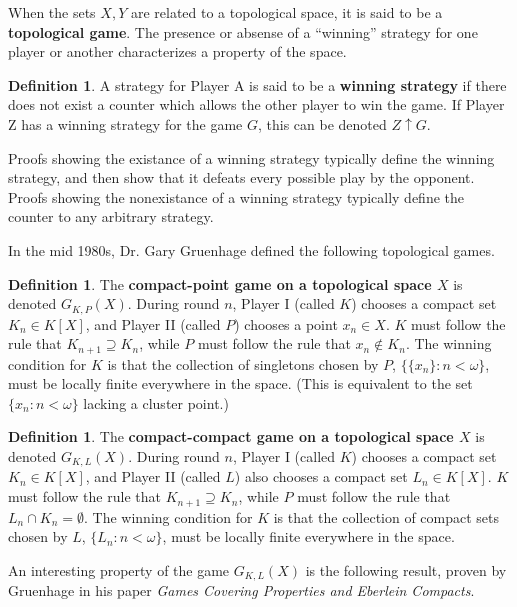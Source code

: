 \documentclass[11pt]{article}
\theoremstyle{plain}
\theoremstyle{definition}
\newtheorem{definition}[theorem]{Definition}
\theoremstyle{remark}
\begin{document}
When the sets $X,Y$ are related to a topological space, it is said to be a \textbf{topological game}. The presence or absense of a ``winning'' strategy for one player or another characterizes a property of the space.

\begin{definition}
A strategy for Player A is said to be a \textbf{winning strategy} if there does not exist a counter which allows the other player to win the game. If Player Z has a winning strategy for the game $G$, this can be denoted $Z \uparrow G$.
\end{definition}

Proofs showing the existance of a winning strategy typically define the winning strategy, and then show that it defeats every possible play by the opponent. Proofs showing the nonexistance of a winning strategy typically define the counter to any arbitrary strategy.

In the mid 1980s, Dr. Gary Gruenhage defined the following topological games.

\begin{definition}
The \textbf{compact-point game on a topological space $X$} is denoted $G_{K,P}(X)$. During round $n$, Player I (called $K$) chooses a compact set $K_n\in K[X]$, and Player II (called $P$) chooses a point $x_n\in X$. $K$ must follow the rule that $K_{n+1}\supseteq K_n$, while $P$ must follow the rule that $x_n\not\in K_n$. The winning condition for $K$ is that the collection of singletons chosen by $P$, $\{\{x_n\} : n<\omega\}$, must be locally finite everywhere in the space. (This is equivalent to the set $\{x_n : n<\omega\}$ lacking a cluster point.)
\end{definition}

\begin{definition}
The \textbf{compact-compact game on a topological space $X$} is denoted $G_{K,L}(X)$. During round $n$, Player I (called $K$) chooses a compact set $K_n\in K[X]$, and Player II (called $L$) also chooses a compact set $L_n\in K[X]$. $K$ must follow the rule that $K_{n+1}\supseteq K_n$, while $P$ must follow the rule that $L_n\cap K_n=\emptyset$. The winning condition for $K$ is that the collection of compact sets chosen by $L$, $\{L_n : n<\omega\}$, must be locally finite everywhere in the space.
\end{definition}

An interesting property of the game $G_{K,L}(X)$ is the following result, proven by Gruenhage in his paper \textit{Games Covering Properties and Eberlein Compacts}.
\end{document}
